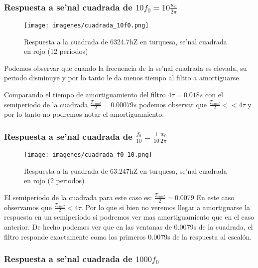 \documentclass[12pt, titlepage]{article}
\begin{document}
    
    \subsubsection{Respuesta a se'nal cuadrada de $10 f_0 = 10\frac{w_0}{2\pi}$ }
    
      \begin{figure}[!htb]
     \texttt{[image: imagenes/cuadrada\_10f0.png]}
     \centering
     \caption{Respuesta a la cuadrada de 6324.7hZ en turquesa, se'nal cuadrada en rojo (12 periodos)}
    \end{figure}
    
    \begin{small}
        Podemos observar que cuando la frecuencia de la se'nal cuadrada es elevada, su periodo disminuye y por lo tanto le da menos tiempo al filtro a amortiguarse. 
    
    Comparando el tiempo de amortiguamiento del filtro $4\tau = 0.018s$ con el semiperiodo de la cuadrada $\frac{T_{cuad}}{2} = 0.00079s$ podemos observar que $\frac{T_{cuad}}{2} << 4\tau$ y por lo tanto no podremos notar el amortiguamiento. 
    \end{small}
    


    
    \subsubsection{Respuesta a se'nal cuadrada de $\frac{f_0}{10} = \frac{1}{10}\frac{w_0}{2\pi}$}
    
     \begin{figure}[!htb]
     \texttt{[image: imagenes/cuadrada\_f0\_10.png]}
     \centering
     \caption{Respuesta a la cuadrada de 63.247hZ en turquesa, se'nal cuadrada en rojo (2 periodos)}
    \end{figure}
    
    El semiperiodo de la cuadrada para este caso es:  $\frac{T_{cuad}}{2} = 0.0079$
    En este caso observamos que $\frac{T_{cuad}}{2} < 4\tau$. Por lo que si bien no veremos llegar a amortiguarse la respuesta en un semiperiodo si podremos ver mas amortiguamiento que en el caso anterior. De hecho podemos ver que en las ventanas de 0.0079s de la cuadrada, el filtro responde exactamente como los primeros 0.0079s de la respuesta al escalón.

    \subsubsection{Respuesta a se'nal cuadrada de $1000f_0$}
    
\end{document}
